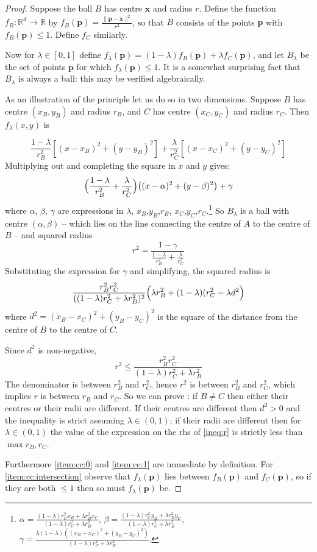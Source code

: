 \documentclass[a4paper]{article}
\newcommand\R{\mathbb{R}}
\begin{document}
\begin{proof}\citep{Welzl}
  \newcommand\x{\mathbf{x}}\newcommand\p{\mathbf{p}}
  Suppose the ball $B$ has centre $\x$ and radius $r$. Define the function $f_B: \R^d\to\R$ by $f_B(\p) = \frac{\|\p-\x\|^2}{r^2}$, so that $B$ consists of the points $\p$ with $f_B(\p)\leq1$. Define $f_C$ similarly.

  Now for $\lambda\in[0,1]$ define $f_\lambda(\p) = (1-\lambda)f_B(\p) + \lambda f_C(\p)$, and let $B_\lambda$ be the set of points $\p$ for which $f_\lambda(\p)\leq1$. It is a somewhat surprising fact that $B_\lambda$ is always a ball: this may be verified algebraically.

  As an illustration of the principle let us do so in two dimensions. Suppose $B$ has centre $(x_B,y_B)$ and radius $r_B$, and $C$ has centre $(x_C,y_C)$ and radius $r_C$. Then $f_\lambda(x,y)$ is

  \[ \frac{1-\lambda}{r_B^2}[(x-x_B)^2 + (y-y_B)^2] + \frac{\lambda}{r_C^2}[(x-x_C)^2 + (y-y_C)^2] \]
  Multiplying out and completing the square in $x$ and $y$ gives:
  \[ \Bigl(\frac{1-\lambda}{r_B^2} + \frac{\lambda}{r_C^2}\Bigr)\bigl((x-\alpha)^2 + (y-\beta)^2\bigr) + \gamma \]
  where $\alpha$, $\beta$, $\gamma$ are expressions in $\lambda$, $x_B$,$y_B$,$r_B$, $x_C$,$y_C$,$r_C$.\footnote{
    $\alpha = \frac{(1-\lambda) r_C^2 x_B + \lambda r_B^2 x_C}{(1-\lambda) r_C^2 + \lambda r_B^2}$,
    $\beta = \frac{(1-\lambda) r_C^2 y_B + \lambda r_B^2 y_C}{(1-\lambda) r_C^2 + \lambda r_B^2}$,
    $\gamma = \frac{\lambda(1-\lambda)((x_B-x_C)^2+(y_B-y_C)^2)}{(1-\lambda) r_C^2 + \lambda r_B^2}$.
  }
  So $B_\lambda$ is a ball with centre $(\alpha,\beta)$ -- which lies on the line connecting the centre of $A$ to the centre of $B$ -- and squared radius \[ r^2=\frac{1-\gamma}{\frac{1-\lambda}{r_B^2} + \frac{\lambda}{r_C^2}} \]
  Substituting the expression for $\gamma$ and simplifying, the squared radius is
  \[
    \frac{r_B^2r_C^2}{((1-\lambda) r_C^2 + \lambda r_B^2)^2}\Bigl( \lambda r_B^2 + (1-\lambda)(r_C^2-\lambda d^2 \Bigr)
  \]
  where $d^2=(x_B-x_C)^2+(y_B-y_C)^2$ is the square of the distance from the centre of $B$ to the centre of $C$.

  Since $d^2$ is non-negative,
  \begin{equation}\label{ineq:r}
    r^2 \leq \frac{r_B^2r_C^2}{(1-\lambda) r_C^2 + \lambda r_B^2}
  \end{equation}
  The denominator is between $r_B^2$ and $r_C^2$, hence $r^2$ is between $r_B^2$ and $r_C^2$, which implies $r$ is between $r_B$ and $r_C$. So we can prove \label{item:cc:radius}: if $B\neq C$ then either their centres or their radii are different. If their centres are different then $d^2>0$ and the inequality \label{ineq:1} is strict assuming $\lambda\in(0,1)$; if their radii are different then for $\lambda\in(0,1)$ the value of the expression on the rhs of \ref{ineq:r} is strictly less than $\max{r_B,r_C}$.

  Furthermore \ref{item:cc:0} and \ref{item:cc:1} are immediate by definition. For \ref{item:cc:intersection} observe that $f_\lambda(\p)$ lies between $f_B(\p)$ and $f_C(\p)$, so if they are both $\leq1$ then so must $f_\lambda(\p)$ be.
\end{proof}
\end{document}
